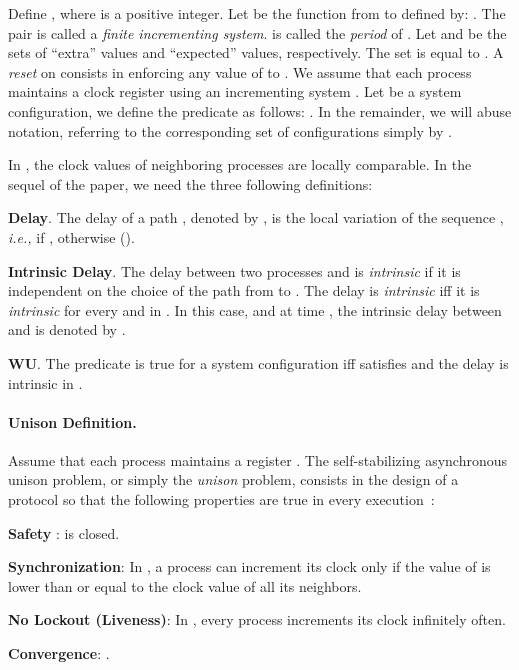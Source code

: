 \documentclass[11pt]{article}
\newcommand{\BEGLIST}{\begin{list}{}{\partopsep -2pt \parsep -2pt \listparindent 0pt}}\newcommand{\ENDLIST}{\end{list}}
\newcommand{\ie}{\emph{i.e., }}
\begin{document}
Define , where  is a positive integer. 
Let  be the function from  to  defined by:
.
The pair  is called a \emph{finite incrementing system}.  is called the \emph{period} of .
Let  and  be the sets of 
``extra'' values and ``expected'' values, respectively.
The set  is equal to .
A \emph{reset} on  consists in enforcing any value of  to .  
We assume that each process  maintains a clock register  using an incrementing system . 
Let  be a system configuration, we define the predicate  as follows:
.
In the remainder, we will abuse notation, referring to the corresponding set of 
configurations simply by . 


In , the clock values of neighboring processes are locally comparable.  In the sequel of the paper,
we need the three following definitions:
\BEGLIST
\item [\textbf{Delay}.]  \label{def:delay} The delay of a path , denoted by
, is the local variation of the sequence 
, \ie  if 
,  otherwise ().
\item  [\textbf{Intrinsic Delay}.] \label{def:intrinsic}
The delay between two processes  and  is \emph{intrinsic} if it is independent on the choice
of the path from  to .  The delay is \emph{intrinsic} iff it is \emph{intrinsic} for every 
 and  in . In this case, and at time , the intrinsic delay between  and  is denoted by .
\item [\textbf{WU}.] The predicate  is true for a system configuration  iff  satisfies  
and the delay is intrinsic in .  
\ENDLIST



\paragraph{Unison Definition.}

Assume that each process  maintains a register . 
The self-stabilizing asynchronous unison problem, or simply the \emph{unison} problem, consists in the 
design of a protocol so that the following properties are true in every execution~\cite{BPV05}:  
\begin{list}{}{\partopsep -2pt \parsep -2pt \listparindent .3in  .3in}
\item[\textbf{Safety }: ]  is closed.
\item[\textbf{Synchronization}: ] 
In , a process can increment its clock  only if the value of  is lower than or equal to
the clock value of all its neighbors. 
\item[\textbf{No Lockout (Liveness)}: ]
In , every process  increments its clock  infinitely often. 
 \item[\textbf{Convergence}: ] 
. 
\end{list}
\end{document}
